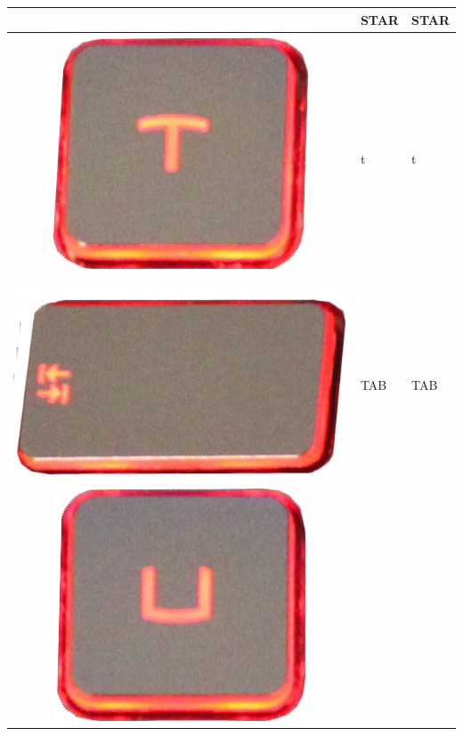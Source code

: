 \begin{longtable}{|cll|}
\begin{minipage}[c]{.3\textwidth}
\vspace{0.2cm}
\end{minipage} & STAR & STAR\\
\hline
\begin{minipage}[c]{.3\textwidth}
\vspace{0.2cm}
\includegraphics[scale=0.06]{Images/KeyMapping/t}
\vspace{0.2cm}
\end{minipage} & t & t\\
\hline
\begin{minipage}[c]{.3\textwidth}
\vspace{0.2cm}
\includegraphics[scale=0.06]{Images/KeyMapping/TAB}
\vspace{0.2cm}
\end{minipage} & TAB & TAB\\
\hline
\begin{minipage}[c]{.3\textwidth}
\vspace{0.2cm}
\includegraphics[scale=0.06]{Images/KeyMapping/u}

\end{minipage}
\end{longtable}
